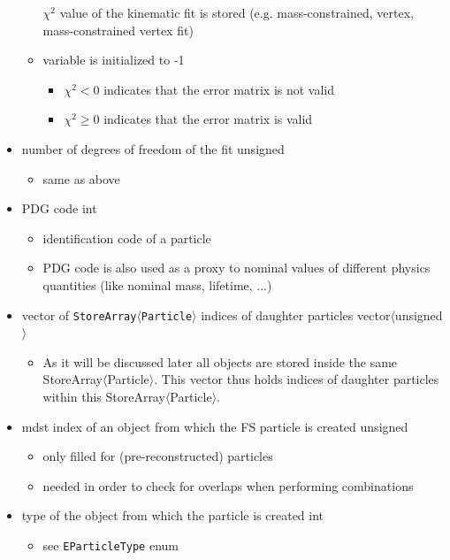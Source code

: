 \begin{itemize}
\begin{itemize}
  $\chi^2$ value of the kinematic fit is stored (e.g. mass-constrained, vertex, mass-constrained vertex fit)
  \item variable is initialized to -1
  \begin{itemize}
   \item $\chi^2<0$ indicates that the error matrix is not valid
   \item $\chi^2\geq 0$ indicates that the error matrix is valid
  \end{itemize}
 \end{itemize}
 \item {\color{blue}number of degrees of freedom of the fit} \hfill{unsigned}
 \begin{itemize}
  \item same as above
 \end{itemize}
 \item {\color{blue} PDG code} \hfill{int}
 \begin{itemize}
  \item identification code of a particle
  \item PDG code is also used as a proxy to nominal values of different physics quantities (like nominal mass, lifetime, ...)
 \end{itemize}
 \item {\color{blue} vector of {\tt StoreArray$\langle$Particle$\rangle$} indices of daughter particles} \hfill{vector$\langle$unsigned$\rangle$}
 \begin{itemize}
  \item As it will be discussed later all \particle objects are stored inside the same StoreArray$\langle$Particle$\rangle$. This vector
  thus holds indices of daughter particles within this StoreArray$\langle$Particle$\rangle$.
 \end{itemize}
 \item {\color{blue} mdst index of an object from which the FS particle is created} \hfill{unsigned}
 \begin{itemize}
  \item only filled for (pre-reconstructed) particles
  \item needed in order to check for overlaps when performing combinations
 \end{itemize}
 \item {\color{blue} type of the \mdst object from which the particle is created } \hfill{int}
 \begin{itemize}
  \item see {\tt EParticleType} enum

\end{itemize}
\end{itemize}
